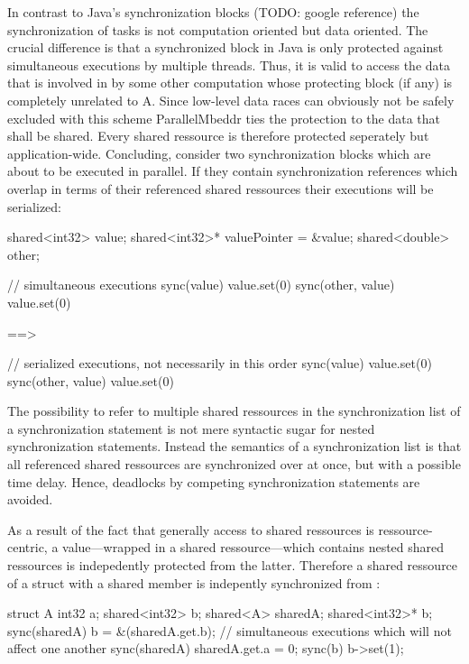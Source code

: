 In contrast to Java's synchronization blocks (TODO: google reference) the synchronization of tasks is not computation oriented but data oriented. The crucial difference is that a synchronized block  in Java is only protected against simultaneous executions by multiple threads. Thus, it is valid to access the data that is involved in  by some other computation whose protecting block (if any) is completely unrelated to A. Since low-level data races can obviously not be safely excluded with this scheme ParallelMbeddr ties the protection to the data that shall be shared. Every shared ressource is therefore protected seperately but application-wide. Concluding, consider two synchronization blocks which are about to be executed in parallel. If they contain synchronization references which overlap in terms of their referenced shared ressources their executions will be serialized:

\begin{ccode}
shared<int32> value;
shared<int32>* valuePointer = &value;
shared<double> other;

// simultaneous executions 
sync(value) { value.set(0) }        sync(other, value) { value.set(0) }
\end{ccode}
==>
\begin{ccode}
// serialized executions, not necessarily in this order
sync(value) { value.set(0) }
sync(other, value) { value.set(0) }
\end{ccode}

The possibility to refer to multiple shared ressources in the synchronization list of a synchronization statement is not mere syntactic sugar for nested synchronization statements. Instead the semantics of a synchronization list is that all referenced shared ressources are synchronized over at once, but with a possible time delay. Hence, deadlocks by competing synchronization statements are avoided.

As a result of the fact that generally access to shared ressources is ressource-centric, a value---wrapped in a shared ressource---which contains nested shared ressources is indepedently protected from the latter. Therefore a shared ressource of a struct with a shared member  is indepently synchronized from :

\begin{ccode}
struct A {
  int32 a;
  shared<int32> b; 
}
shared<A> sharedA;
shared<int32>* b;
sync(sharedA) { b = &(sharedA.get.b); }
// simultaneous executions which will not affect one another
sync(sharedA) { sharedA.get.a = 0; }   sync(b) { b->set(1); }
\end{ccode}

